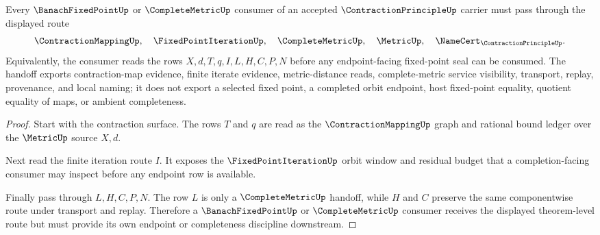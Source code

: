 \begin{theorem}
\label{thm:contraction-principle-completion-handoff}
Every $\BanachFixedPointUp$ or $\CompleteMetricUp$ consumer of an accepted $\ContractionPrincipleUp$ carrier must pass through the displayed route
$$
\ContractionMappingUp,\quad
\FixedPointIterationUp,\quad
\CompleteMetricUp,\quad
\MetricUp,\quad
\NameCert_{\ContractionPrincipleUp}.
$$
Equivalently, the consumer reads the rows $X,d,T,q,I,L,H,C,P,N$ before any endpoint-facing fixed-point seal can be consumed. The handoff exports contraction-map evidence, finite iterate evidence, metric-distance reads, complete-metric service visibility, transport, replay, provenance, and local naming; it does not export a selected fixed point, a completed orbit endpoint, host fixed-point equality, quotient equality of maps, or ambient completeness.
\end{theorem}
\begin{proof}
Start with the contraction surface. The rows $T$ and $q$ are read as the $\ContractionMappingUp$ graph and rational bound ledger over the $\MetricUp$ source $X,d$.

Next read the finite iteration route $I$. It exposes the $\FixedPointIterationUp$ orbit window and residual budget that a completion-facing consumer may inspect before any endpoint row is available.

Finally pass through $L,H,C,P,N$. The row $L$ is only a $\CompleteMetricUp$ handoff, while $H$ and $C$ preserve the same componentwise route under transport and replay. Therefore a $\BanachFixedPointUp$ or $\CompleteMetricUp$ consumer receives the displayed theorem-level route but must provide its own endpoint or completeness discipline downstream.
\end{proof}


\begin{closurestatus}{\ContractionPrincipleUp}
  \theoryclosure{\seedClosure}
  \formalstatus{\unformalizedV}
\end{closurestatus}
